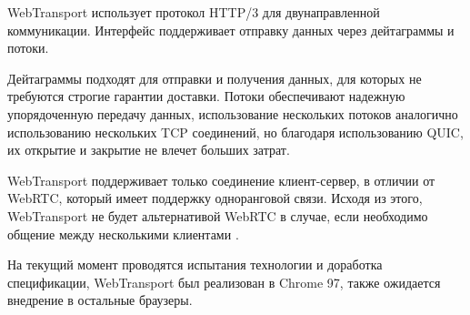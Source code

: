 WebTransport использует протокол HTTP/3 для двунаправленной коммуникации. Интерфейс поддерживает отправку данных через дейтаграммы и потоки.

Дейтаграммы подходят для отправки и получения данных, для которых не требуются строгие гарантии доставки. Потоки обеспечивают надежную упорядоченную передачу данных, использование нескольких потоков аналогично использованию нескольких TCP соединений, но благодаря использованию QUIC, их открытие и закрытие не влечет больших затрат.

WebTransport поддерживает только соединение клиент-сервер, в отличии от WebRTC, который имеет поддержку одноранговой связи. Исходя из этого, WebTransport не будет альтернативой WebRTC в случае, если необходимо общение между несколькими клиентами \cite{WebTransportW3C}.

На текущий момент проводятся испытания технологии и доработка спецификации, WebTransport был реализован в Chrome 97, также ожидается внедрение в остальные браузеры.